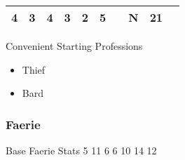 \documentclass[12pt]{article}
\newcommand{\WviiTwoColumnSetup}{\raggedcolumns\RaggedRight}
\begin{document}
\begin{longtable}[]{@{}llllllllll@{}}
\begin{minipage}[t]{0.06\columnwidth}\raggedright\strut
4
\strut\end{minipage} &
\begin{minipage}[t]{0.06\columnwidth}\raggedright\strut
3
\strut\end{minipage} &
\begin{minipage}[t]{0.06\columnwidth}\raggedright\strut
4
\strut\end{minipage} &
\begin{minipage}[t]{0.06\columnwidth}\raggedright\strut
3
\strut\end{minipage} &
\begin{minipage}[t]{0.06\columnwidth}\raggedright\strut
2
\strut\end{minipage} &
\begin{minipage}[t]{0.06\columnwidth}\raggedright\strut
5
\strut\end{minipage} &
\begin{minipage}[t]{0.06\columnwidth}\raggedright\strut
\strut\end{minipage} &
\begin{minipage}[t]{0.07\columnwidth}\raggedright\strut
N
\strut\end{minipage} &
\begin{minipage}[t]{0.08\columnwidth}\raggedright\strut
21
\strut\end{minipage}\tabularnewline
\bottomrule
\end{longtable}

Convenient Starting Professions

\begin{multicols}{2}\WviiTwoColumnSetup
\begin{itemize}
\item
  Thief
\item
  Bard
\end{itemize}
\end{multicols}

\subsubsection{Faerie}\label{faerie}

Base Faerie Stats 5 11 6 6 10 14 12
\end{document}
